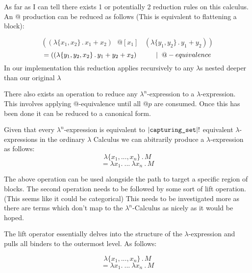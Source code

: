 \documentclass{article}
\begin{document}
\noindent As far as I can tell there exists 1 or potentially 2 reduction rules on this calculus. An @ production can be reduced as follows (This is equivalent to flattening a block):

\begin{equation}
    ((\lambda\{x_1, x_2\}\,.\, x_1 + x_2) \>\>\>@[x_1]\>\>\>\>(\lambda\{y_1, y_2\}\,.\, y_1 + y_2)) 
\end{equation}
\begin{equation}
   = ((\lambda\{y_1, y_2, x_2\}\,.\, y_1 + y_2 + x_2) \hspace{10mm}|\hspace{2mm}@-equivalence
\end{equation}
\noindent In our implementation this reduction applies recursively to any $\lambda$s nested deeper than our original $\lambda$

\noindent There also exists an operation to reduce any $\lambda^n$-expression to a $\lambda$-expression. This involves applying @-equivalence until all @$p$ are consumed. Once this has been done it can be reduced to a canonical form.

\noindent Given that every $\lambda^{n}$-expression is equivalent to $|\verb|capturing_set||!$ equivalent $\lambda$-expressions in the ordinary $\lambda$ Calculus we can abitrarily produce a $\lambda$-expression as follows: 
\begin{equation}
    \lambda\{x_1,..., x_n\}\,.\,M
\end{equation}
\begin{equation}
   = \lambda x_1 .\>...\>\lambda x_n\>.\,M  
\end{equation}
\par
\noindent The above operation can be used alongside the path to target a specific region of blocks. The second operation needs to be followed by some sort of lift operation. (This seems like it could be categorical) This needs to be investigated more as there are terms which don't map to the $\lambda^n$-Calculus as nicely as it would be hoped.

\noindent The lift operator essentially delves into the structure of the $\lambda$-expression and pulls all binders to the outermost level. As follows:

\begin{equation}
    \lambda\{x_1,..., x_n\}\,.\,M
\end{equation}
\begin{equation}
   = \lambda x_1 .\>...\>\lambda x_n\>.\,M  
\end{equation}
\end{document}
